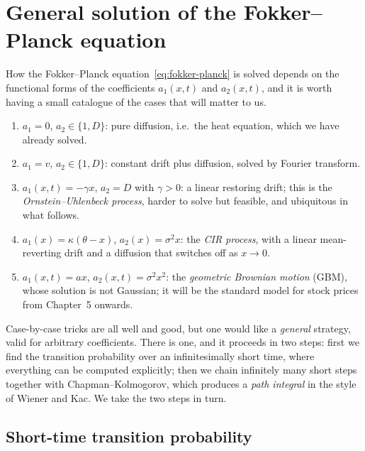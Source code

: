 \section{General solution of the Fokker--Planck equation}
\label{sec:general-solution-fp}

How the Fokker--Planck equation~\eqref{eq:fokker-planck} is solved depends on the functional forms of the coefficients $a_1(x,t)$ and $a_2(x,t)$, and it is worth having a small catalogue of the cases that will matter to us.
\begin{enumerate}
    \item $a_1=0$, $a_2\in\{1,D\}$: pure diffusion, i.e.\ the heat equation, which we have already solved.
    \item $a_1=v$, $a_2\in\{1,D\}$: constant drift plus diffusion, solved by Fourier transform.
    \item $a_1(x,t)=-\gamma x$, $a_2=D$ with $\gamma>0$: a linear restoring drift; this is the \emph{Ornstein--Uhlenbeck process},\cite{UhlenbeckOrnstein1930} harder to solve but feasible, and ubiquitous in what follows.
    \item $a_1(x)=\kappa(\theta-x)$, $a_2(x)=\sigma^2 x$: the \emph{CIR process},\cite{CIR1985} with a linear mean-reverting drift and a diffusion that switches off as $x\to0$.
    \item $a_1(x,t)=ax$, $a_2(x,t)=\sigma^2 x^2$: the \emph{geometric Brownian motion} (GBM), whose solution is not Gaussian; it will be the standard model for stock prices from Chapter~5 onwards.
\end{enumerate}

Case-by-case tricks are all well and good, but one would like a \emph{general} strategy, valid for arbitrary coefficients.
There is one, and it proceeds in two steps: first we find the transition probability over an infinitesimally short time, where everything can be computed explicitly; then we chain infinitely many short steps together with Chapman--Kolmogorov, which produces a \emph{path integral} in the style of Wiener and Kac.
We take the two steps in turn.

\subsection{Short-time transition probability}

